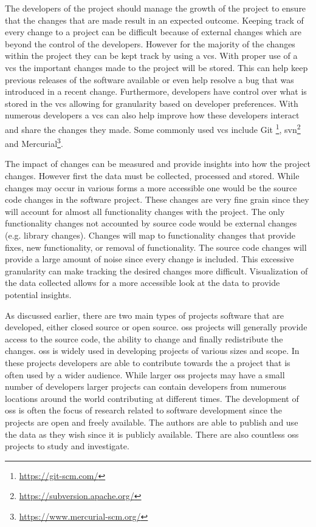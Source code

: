 The developers of the project should manage the growth of the project to ensure that the changes that are made result in an expected outcome. Keeping track of every change to a project can be difficult because of external changes which are beyond the control of the developers. However for the majority of the changes within the project they can be kept track by using a \gls{vcs}. With proper use of a \gls{vcs} the important changes made to the project will be stored. This can help keep previous releases of the software available or even help resolve a bug that was introduced in a recent change. Furthermore, developers have control over what is stored in the \gls{vcs} allowing for granularity based on developer preferences. With numerous developers a \gls{vcs} can also help improve how these developers interact and share the changes they made. Some commonly used \gls{vcs} include Git \footnote{\url{https://git-scm.com/}}, \gls{svn}\footnote{\url{https://subversion.apache.org/}} and Mercurial\footnote{\url{https://www.mercurial-scm.org/}}.

The impact of changes can be measured and provide insights into how the project changes. However first the data must be collected, processed and stored. While changes may occur in various forms a more accessible one would be the source code changes in the software project. These changes are very fine grain since they will account for almost all functionality changes with the project. The only functionality changes not accounted by source code would be external changes (e.g. library changes). Changes will map to functionality changes that provide fixes, new functionality, or removal of functionality. The source code changes will provide a large amount of noise since every change is included. This excessive granularity can make tracking the desired changes more difficult. Visualization of the data collected allows for a more accessible look at the data to provide potential insights.



As discussed earlier, there are two main types of projects software that are developed, either closed source or open source. \gls{oss} projects will generally provide access to the source code, the ability to change and finally redistribute the changes. \gls{oss} is widely used in developing projects of various sizes and scope. In these projects developers are able to contribute towards the a project that is often used by a wider audience. While larger \gls{oss} projects may have a small number of developers larger projects can contain developers from numerous locations around the world contributing at different times. The development of \gls{oss} is often the focus of research related to software development since the projects are open and freely available. The authors are able to publish and use the data as they wish since it is publicly available. There are also countless \gls{oss} projects to study and investigate.

